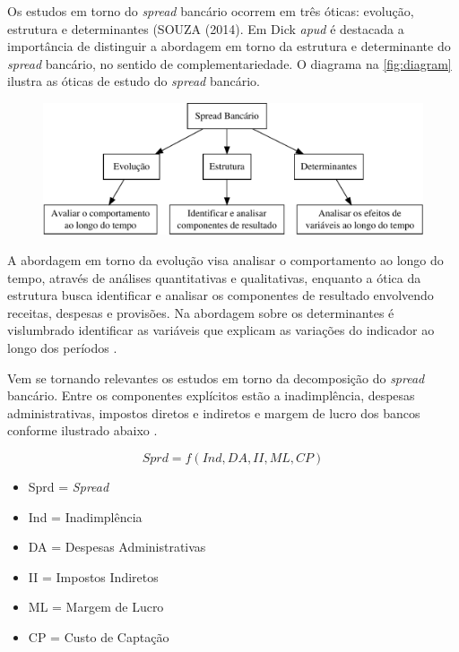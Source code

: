 \documentclass[12pt,openright,oneside,a4paper,chapter=TITLE,section=TITLE,subsection=TITLE,english,french,spanish,portugues,sumario=tradicional]{abntex2}
\providecommand{\tightlist}{%
  \setlength{\itemsep}{0pt}\setlength{\parskip}{0pt}}
\begin{document}
Os estudos em torno do \emph{spread} bancário ocorrem em três óticas: evolução,
estrutura e determinantes (SOUZA (2014). Em Dick \emph{apud} \cite{leal:2006} é
destacada a importância de distinguir a abordagem em torno da estrutura e
determinante do \emph{spread} bancário, no sentido de complementariedade. O diagrama
na \autoref{fig:diagram} ilustra as óticas de estudo do \emph{spread} bancário.

\begin{figure}

\begin{center}\includegraphics{12-exportedfigures/diagram.spread-1} \end{center}
\label{fig:diagram}
\end{figure}

A abordagem em torno da evolução visa analisar o comportamento ao longo do
tempo, através de análises quantitativas e qualitativas, enquanto a ótica da
estrutura busca identificar e analisar os componentes de resultado envolvendo
receitas, despesas e provisões. Na abordagem sobre os determinantes é
vislumbrado identificar as variáveis que explicam as variações do indicador ao
longo dos períodos \cite{leal:2006}.

Vem se tornando relevantes os estudos em torno da decomposição do \emph{spread}
bancário. Entre os componentes explícitos estão a inadimplência, despesas
administrativas, impostos diretos e indiretos e margem de lucro dos bancos
conforme ilustrado abaixo \cite{BCB:2000}.

\[
Sprd=f(Ind, DA, II, ML, CP)
\]

\begin{itemize}
\tightlist
\item
  Sprd = \emph{Spread}
\item
  Ind = Inadimplência
\item
  DA = Despesas Administrativas
\item
  II = Impostos Indiretos
\item
  ML = Margem de Lucro
\item
  CP = Custo de Captação
\end{itemize}
\end{document}
